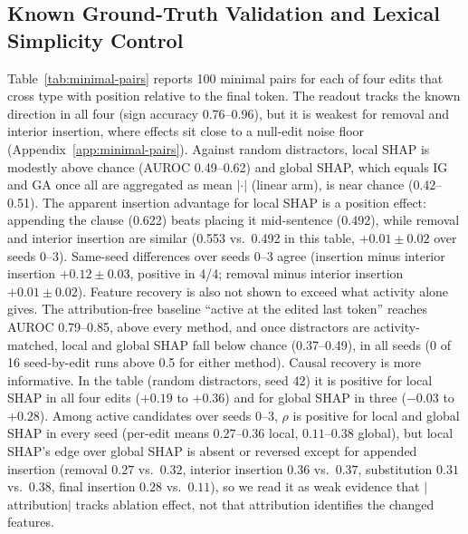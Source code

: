 \subsection{Known Ground-Truth Validation and Lexical Simplicity Control}
Table~\ref{tab:minimal-pairs} reports 100 minimal pairs for each of four edits that cross type with position relative to the final token. The readout tracks the known direction in all four (sign accuracy 0.76--0.96), but it is weakest for removal and interior insertion, where effects sit close to a null-edit noise floor (Appendix~\ref{app:minimal-pairs}). Against random distractors, local SHAP is modestly above chance (AUROC 0.49--0.62) and global SHAP, which equals IG and GA once all are aggregated as mean $|\cdot|$ (linear arm), is near chance (0.42--0.51). The apparent insertion advantage for local SHAP is a position effect: appending the clause (0.622) beats placing it mid-sentence (0.492), while removal and interior insertion are similar (0.553 vs.\ 0.492 in this table, $+0.01\pm0.02$ over seeds 0--3). Same-seed differences over seeds 0--3 agree (insertion minus interior insertion $+0.12 \pm 0.03$, positive in 4/4; removal minus interior insertion $+0.01 \pm 0.02$). Feature recovery is also not shown to exceed what activity alone gives. The attribution-free baseline ``active at the edited last token'' reaches AUROC 0.79--0.85, above every method, and once distractors are activity-matched, local and global SHAP fall below chance (0.37--0.49), in all seeds (0 of 16 seed-by-edit runs above 0.5 for either method). Causal recovery is more informative. In the table (random distractors, seed 42) it is positive for local SHAP in all four edits ($+0.19$ to $+0.36$) and for global SHAP in three ($-0.03$ to $+0.28$). Among active candidates over seeds 0--3, $\rho$ is positive for local and global SHAP in every seed (per-edit means $0.27$--$0.36$ local, $0.11$--$0.38$ global), but local SHAP's edge over global SHAP is absent or reversed except for appended insertion (removal $0.27$ vs.\ $0.32$, interior insertion $0.36$ vs.\ $0.37$, substitution $0.31$ vs.\ $0.38$, final insertion $0.28$ vs.\ $0.11$), so we read it as weak evidence that $|$attribution$|$ tracks ablation effect, not that attribution identifies the changed features.
